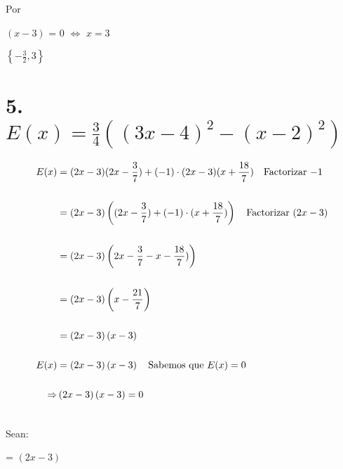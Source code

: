 \documentclass[12pt]{article}
\begin{document}
Por {}

\begin{center}
   
  $\left(x-3\right)$ = $0$  $\Leftrightarrow$ $ x= 3$ 
   
\end{center}

{}

\begin{center}
   
  $\left\{-\frac{3}{2},3\right\}$ 
   
\end{center}

\newpage

\section*{5. $E(x) = \frac{3}{4}\left((3x-4)^{2} - (x-2)^{2}\right)$}

{}

\begin{equation*}
    \begin{split}
      E(x) & = (2x-3)(2x-\frac{3}{7})+(-1)\cdot(2x-3)(x+\frac{18}{7}) \quad \textup{Factorizar $-1$} \\\\ 
      & = (2x-3)\left((2x-\frac{3}{7})+(-1)\cdot(x+\frac{18}{7})\right) \quad \textup{Factorizar $(2x-3)$}\\\\
      & = (2x-3)\left(2x-\frac{3}{7}-x-\frac{18}{7})\right)\\\\
      & = \left(2x-3\right)\left(x-\frac{21}{7}\right)\\\\
     & = \left(2x-3\right)\left(x-3\right)\\\\
      E(x) & =\left(2x-3\right)\left(x-3\right) \quad \textup{Sabemos que $E(x)= 0$} \\\\
      \Rightarrow & \left(2x-3\right)\left(x-3\right) = 0 \quad \\\\
    \end{split}
\end{equation*}

Sean: 
\begin{center}
   {} = $\left(2x-3\right)$   
\end{center}
\end{document}
